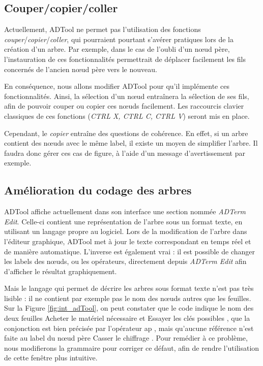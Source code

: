 	
	\subsection{Couper/copier/coller}	
		Actuellement, ADTool ne permet pas l'utilisation des fonctions \emph{couper}/\emph{copier}/\emph{coller}, qui pourraient pourtant s'avérer pratiques lors de la création d'un arbre. Par exemple, dans le cas de l'oubli d'un nœud père, l'instauration de ces fonctionnalités permettrait de déplacer facilement les fils concernés de l'ancien nœud père vers le nouveau.
		
		En conséquence, nous allons modifier ADTool pour qu'il implémente ces fonctionnalités. Ainsi, la sélection d'un nœud entraînera la sélection de ses fils, afin de pouvoir couper ou copier ces nœuds facilement. Les raccourcis clavier \og classiques \fg{}  de ces fonctions (\emph{CTRL X, CTRL C, CTRL V}) seront mis en place.

		Cependant, le \emph{copier} entraîne des questions de cohérence. En effet, si un arbre contient des nœuds avec le même label, il existe un moyen de simplifier l'arbre. Il faudra donc gérer ces cas de figure, à l'aide d'un message d'avertissement par exemple.

	\subsection{Amélioration du codage des arbres}
		ADTool affiche actuellement dans son interface une section nommée \emph{ADTerm Edit}. Celle-ci contient une représentation de l'arbre sous un format texte, en utilisant un langage propre au logiciel. Lors de la modification de l'arbre dans l'éditeur graphique, ADTool met à jour le texte correspondant en temps réel et de manière automatique. L'inverse est également vrai : il est possible de changer les labels des nœuds, ou les opérateurs, directement depuis \emph{ADTerm Edit} afin d'afficher le résultat graphiquement.

		Mais le langage qui permet de décrire les arbres sous format texte n'est pas très lisible : il ne contient par exemple pas le nom des nœuds autres que les feuilles. Sur la {\sc Figure} \ref{fig:int_adTool}, on peut constater que le code indique le nom des deux feuilles \og Acheter le matériel nécessaire \fg{} et \og Essayer les clés possibles \fg{}, que la conjonction est bien précisée par l'opérateur \og ap \fg{}, mais qu'aucune référence n'est faite au label du nœud père \og Casser le chiffrage \fg{}. Pour remédier à ce problème, nous modifierons la grammaire pour corriger ce défaut, afin de rendre l'utilisation de cette fenêtre plus intuitive.

